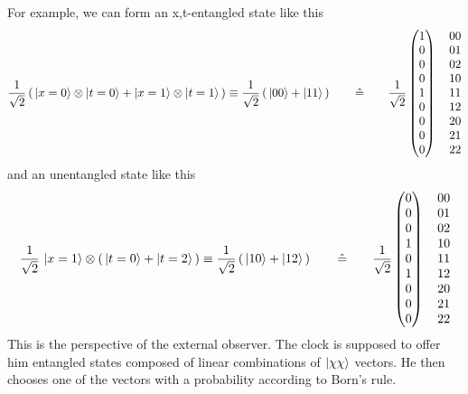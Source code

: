 \documentclass[12pt]{article}
\begin{document}
For example, we can form an x,t-entangled state like this
\begin{equation*}
\frac{1}{\sqrt{2}} \left(\, \ket{x=0}\otimes\ket{t=0} + \ket{x=1}\otimes\ket{t=1} \,\right) \equiv 
\frac{1}{\sqrt{2}} \left(\, \ket{00} + \ket{11} \,\right)
\quad\quad\hat{=}\quad\quad
\frac{1}{\sqrt{2}}
\begin{pmatrix}
1 \\ 0 \\ 0 \\ 0 \\ 1 \\ 0 \\ 0 \\ 0 \\ 0 
\end{pmatrix}
\quad
\begin{matrix}
00 \\ 01 \\ 02 \\ 10 \\ 11 \\ 12 \\ 20 \\ 21 \\ 22 
\end{matrix}
\end{equation*}
and an unentangled state like this
\begin{equation*}
\frac{1}{\sqrt{2}}\, \ket{x=1}\otimes \left(\,\ket{t=0} + \ket{t=2} \,\right) \equiv 
\frac{1}{\sqrt{2}} \left(\, \ket{10} + \ket{12} \,\right)
\quad\quad\hat{=}\quad\quad
\frac{1}{\sqrt{2}}
\begin{pmatrix}
0 \\ 0 \\ 0 \\ 1 \\ 0 \\ 1 \\ 0 \\ 0 \\ 0 
\end{pmatrix}
\quad
\begin{matrix}
00 \\ 01 \\ 02 \\ 10 \\ 11 \\ 12 \\ 20 \\ 21 \\ 22 
\end{matrix}
\end{equation*}
This is the perspective of the external observer. The clock is supposed to offer him entangled states composed of linear combinations of $\ket{\chi\chi}$ vectors. He then chooses one of the vectors with a probability according to Born's rule. 
\end{document}
